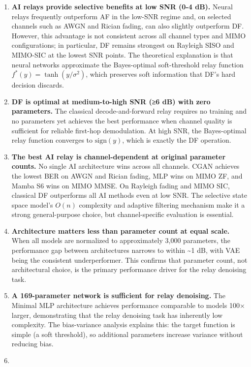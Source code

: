 \begin{enumerate}
\def\labelenumi{\arabic{enumi}.}
\item
  \textbf{AI relays provide selective benefits at low SNR (0-4 dB).} Neural relays frequently outperform AF in the low-SNR regime and, on selected channels such as AWGN and Rician fading, can also slightly outperform DF. However, this advantage is not consistent across all channel types and MIMO configurations; in particular, DF remains strongest on Rayleigh SISO and MIMO-SIC at the lowest SNR points. The theoretical explanation is that neural networks approximate the Bayes-optimal soft-threshold relay function \(f^*(y) = \tanh(y/\sigma^2)\), which preserves soft information that DF's hard decision discards.
\item
  \textbf{DF is optimal at medium-to-high SNR (≥6 dB) with zero parameters.} The classical decode-and-forward relay requires no training and no parameters yet achieves the best performance when channel quality is sufficient for reliable first-hop demodulation. At high SNR, the Bayes-optimal relay function converges to \(\text{sign}(y)\), which is exactly the DF operation.
\item
  \textbf{The best AI relay is channel-dependent at original parameter counts.} No single AI architecture wins across all channels. CGAN achieves the lowest BER on AWGN and Rician fading, MLP wins on MIMO ZF, and Mamba S6 wins on MIMO MMSE. On Rayleigh fading and MIMO SIC, classical DF outperforms all AI methods even at low SNR. The selective state space model's \(O(n)\) complexity and adaptive filtering mechanism make it a strong general-purpose choice, but channel-specific evaluation is essential.
\item
  \textbf{Architecture matters less than parameter count at equal scale.} When all models are normalized to approximately 3,000 parameters, the performance gap between architectures narrows to within \textasciitilde1 dB, with VAE being the consistent underperformer. This confirms that parameter count, not architectural choice, is the primary performance driver for the relay denoising task.
\item
  \textbf{A 169-parameter network is sufficient for relay denoising.} The Minimal MLP architecture achieves performance comparable to models 100× larger, demonstrating that the relay denoising task has inherently low complexity. The bias-variance analysis explains this: the target function is simple (a soft threshold), so additional parameters increase variance without reducing bias.
\item

\end{enumerate}
